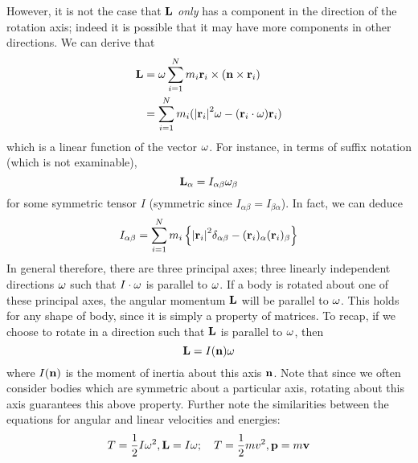 However, it is not the case that \(\vb L\) \textit{only} has a component in the direction of the rotation axis; indeed it is possible that it may have more components in other directions.
We can derive that
\begin{align*}
	\vb L & = \omega \sum_{i=1}^N m_i \vb r_i \times (\vb n \times \vb r_i)                            \\
	      & = \sum_{i=1}^N m_i (\abs{\vb r_i}^2 \vb\omega - (\vb r_i \cdot \vb \omega) \vb r_i)
\end{align*}
which is a linear function of the vector \(\vb\omega\).
For instance, in terms of suffix notation (which is not examinable),
\[
	\vb L_\alpha = I_{\alpha\beta} \omega_\beta
\]
for some symmetric tensor \(I\) (symmetric since \(I_{\alpha\beta} = I_{\beta\alpha}\)).
In fact, we can deduce
\[
	I_{\alpha\beta} = \sum_{i=1}^N m_i \left\{ \abs{\vb r_i}^2 \delta_{\alpha\beta} - (\vb r_i)_\alpha (\vb r_i)_\beta \right\}
\]
In general therefore, there are three principal axes; three linearly independent directions \(\vb \omega\) such that \(I \cdot \vb \omega\) is parallel to \(\vb \omega\).
If a body is rotated about one of these principal axes, the angular momentum \(\vb L\) will be parallel to \(\vb\omega\).
This holds for any shape of body, since it is simply a property of matrices.
To recap, if we choose to rotate in a direction such that \(\vb L\) is parallel to \(\vb \omega\), then
\[
	\vb L = I(\vb n) \vb \omega
\]
where \(I(\vb n)\) is the moment of inertia about this axis \(\vb n\).
Note that since we often consider bodies which are symmetric about a particular axis, rotating about this axis guarantees this above property.
Further note the similarities between the equations for angular and linear velocities and energies:
\[
	T = \frac{1}{2}I\omega^2, \vb L = I\vb\omega;\quad T = \frac{1}{2}mv^2, \vb p = m\vb v
\]


